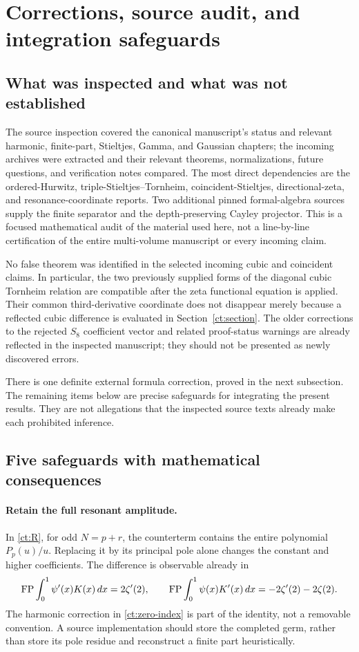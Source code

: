 \section{Corrections, source audit, and integration safeguards}
\label{audit:section}

\subsection{What was inspected and what was not established}

The source inspection covered the canonical manuscript's status and
relevant harmonic, finite-part, Stieltjes, Gamma, and Gaussian chapters;
the incoming archives were extracted and their relevant theorems,
normalizations, future questions, and verification notes compared.
The most direct dependencies are the ordered-Hurwitz,
triple-Stieltjes--Tornheim, coincident-Stieltjes, directional-zeta, and
resonance-coordinate reports. Two additional pinned formal-algebra
sources supply the finite separator and the depth-preserving Cayley
projector. This is a focused mathematical audit of the material used
here, not a line-by-line certification of the entire multi-volume
manuscript or every incoming claim.

No false theorem was identified in the selected incoming cubic and
coincident claims. In particular, the two previously supplied forms of
the diagonal cubic Tornheim relation are compatible after the zeta
functional equation is applied. Their common third-derivative coordinate
does not disappear merely because a reflected cubic difference is
evaluated in Section~\ref{ct:section}. The older corrections to the
rejected $S_8$ coefficient vector and related proof-status warnings are
already reflected in the inspected manuscript; they should not be
presented as newly discovered errors.

There is one definite external formula correction, proved in the next
subsection. The remaining items below are precise safeguards for
integrating the present results. They are not allegations that the
inspected source texts already make each prohibited inference.



\subsection{Five safeguards with mathematical consequences}

\paragraph{Retain the full resonant amplitude.}
In \eqref{ct:R}, for odd $N=p+r$, the counterterm contains the entire
polynomial $P_p(u)/u$. Replacing it by its principal pole alone changes
the constant and higher coefficients. The difference is observable
already in
\[
 \operatorname{FP}\int_0^1\psi'(x)K(x)\,dx=2\zeta'(2),\qquad
 \operatorname{FP}\int_0^1\psi(x)K'(x)\,dx=-2\zeta'(2)-2\zeta(2).
\]
The harmonic correction in \eqref{ct:zero-index} is part of the identity,
not a removable convention. A source implementation should store the
completed germ, rather than store its pole residue and reconstruct a
finite part heuristically.

